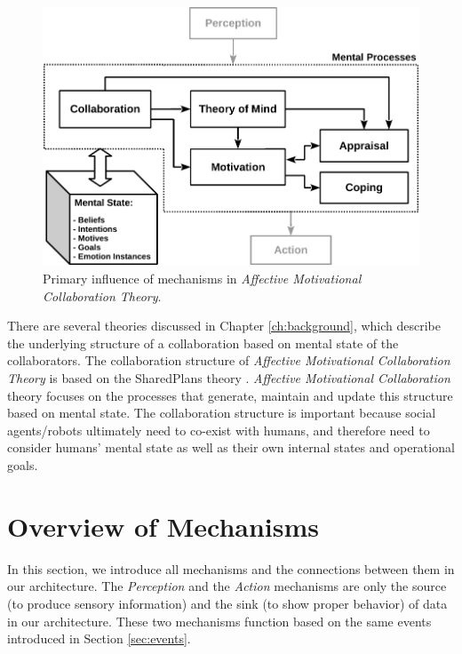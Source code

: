 \documentclass[12pt]{report}
\begin{document}
\begin{figure}[h!] 
  \centering
  \includegraphics[scale=1]{figure/theory-general-croped.pdf}
  \caption{Primary influence of mechanisms in \textit{Affective Motivational
  Collaboration Theory}.}
  \label{fig:theory}
  \vspace*{-2mm}
\end{figure}

There are several theories discussed in Chapter \ref{ch:background}, which
describe the underlying structure of a collaboration based on mental state of
the collaborators. The collaboration structure of \textit{Affective Motivational
Collaboration Theory} is based on the SharedPlans theory
\cite{grosz:shared-plans}. \textit{Affective Motivational Collaboration} theory
focuses on the processes that generate, maintain and update this structure
based on mental state. The collaboration structure is important because social
agents/robots ultimately need to co-exist with humans, and therefore need to
consider humans' mental state as well as their own internal states and
operational goals.

\section{Overview of Mechanisms}

In this section, we introduce all mechanisms and the connections
between them in our architecture. The \textit{Perception} and the
\textit{Action} mechanisms are only the source (to produce sensory information)
and the sink (to show proper behavior) of data in our architecture. These two
mechanisms function based on the same events introduced in Section
\ref{sec:events}.
\end{document}

